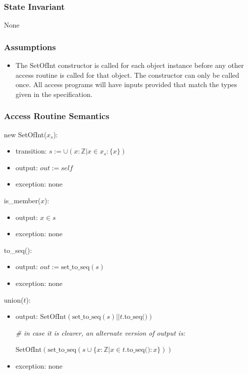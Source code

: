 \documentclass[12pt,fleqn]{examtst}
\begin{document}
\subsubsection* {State Invariant}

None

\subsubsection* {Assumptions}

\begin{itemize}
\item The SetOfInt constructor is called for each object instance before any
  other access routine is called for that object.  The constructor can only be
  called once.  All access programs will have inputs provided that match the types
  given in the specification.
\end{itemize}

\subsubsection* {Access Routine Semantics}

\noindent new SetOfInt($x_s$):
\begin{itemize}
\item transition: $s := \cup (x: \mathbb{Z} | x \in x_s : \{ x \} )$
\item output: $\mathit{out} := \mathit{self}$
\item exception: none
\end{itemize}

\noindent is\_member($x$):
\begin{itemize}
\item output: $x \in s$
\item exception: none
\end{itemize}

\noindent to\_seq():
\begin{itemize}
\item output: $out := \mbox{set\_to\_seq}(s)$
\item exception: none
\end{itemize}

\noindent union($t$):
\begin{itemize}
\item output: $\text{SetOfInt} (\mbox{set\_to\_seq}(s) ||
  t.\text{to\_seq()})$

  \textit{\# in case it is clearer, an alternate version of output is:}
  
  $\text{SetOfInt}(\text{set\_to\_seq}(s \cup \{x: \mathbb{Z} | x \in t.\text{to\_seq()} : x \}))$
  
\item exception: none
\end{itemize}
\end{document}
